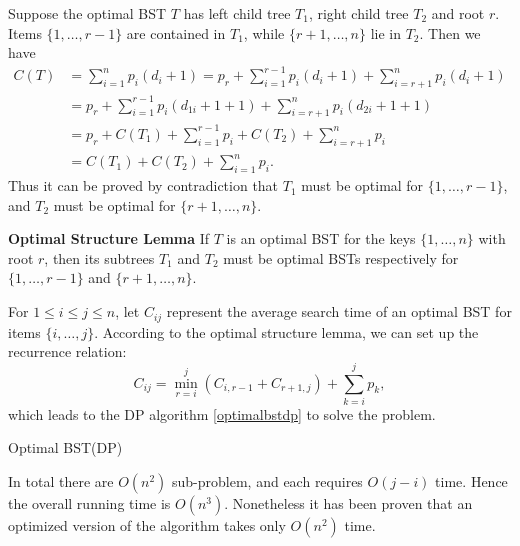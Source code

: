Suppose the optimal BST $T$ has left child tree $T_1$, right child tree $T_2$ and root $r$. Items $\{1,\dots,r-1\}$ are contained in $T_1$, while $\{r+1,\dots,n\}$ lie in $T_2$. Then we have
\begin{align*}
C(T)&=\sum\limits_{i=1}^np_i(d_i+1)=p_r + \sum\limits_{i=1}^{r-1}p_i(d_i+1) + \sum\limits_{i=r+1}^{n}p_i(d_i+1)\\
&=p_r+\sum\limits_{i=1}^{r-1}p_i(d_{1i}+1 + 1) + \sum\limits_{i=r+1}^{n}p_i(d_{2i}+1 + 1)\\
&=p_r+C(T_1)+\sum\limits_{i=1}^{r-1}p_i + C(T_2)+\sum\limits_{i=r+1}^{n}p_i\\
&=C(T_1)+C(T_2)+\sum\limits_{i=1}^{n}p_i.
\end{align*}
Thus it can be proved by contradiction that $T_1$ must be optimal for $\{1,\dots,r-1\}$, and $T_2$ must be optimal for $\{r+1,\dots,n\}$. 
\begin{lemma}\textbf{Optimal Structure Lemma}
If $T$ is an optimal BST for the keys $\{1,\dots,n\}$ with root $r$, then its subtrees $T_1$ and $T_2$ must be optimal BSTs respectively for $\{1,\dots,r-1\}$ and $\{r+1,\dots,n\}$.
\end{lemma}
For $1\leq i\leq j\leq n$, let $C_{ij}$ represent the average search time of an optimal BST for items $\{i,\dots,j\}$. According to the optimal structure lemma, we can set up the recurrence relation:
\begin{equation*}
C_{ij}=\min\limits_{r=i}^j\left(C_{i,r-1}+C_{r+1,j}\right)+\sum\limits_{k=i}^jp_k,
\end{equation*}
which leads to the DP algorithm \ref{optimalbstdp} to solve the problem.
\begin{algorithm}[ht]
\caption{Optimal BST(DP)}\label{optimalbstdp}
\begin{algorithmic}[1]
\EndFor\EndFor
\end{algorithmic}
\end{algorithm}

In total there are $O(n^2)$ sub-problem, and each requires $O(j-i)$ time. Hence the overall running time is $O(n^3)$. Nonetheless it has been proven that an optimized version of the algorithm takes only $O(n^2)$ time.
\ifx\PREAMBLE\undefined

\fi